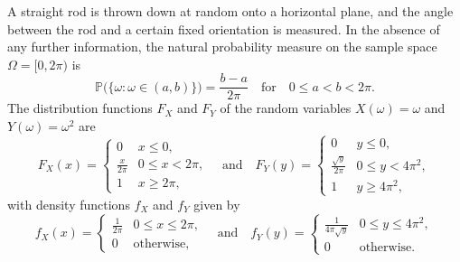 \documentclass[lecture]{csm}
\newcommand{\prob}{\mathbb{P}}
\newcommand{\R}{\mathbb{R}}
\def\it{\item}
\def\bit{\begin{itemize}}
\def\eit{\end{itemize}}
\begin{document}
%
%

\newpage

\begin{example}
A straight rod is thrown down at random onto a horizontal plane, and the angle between the rod and a certain fixed orientation is measured. In the absence of any further information, the natural probability measure on the sample space $\Omega = [0,2\pi)$ is
\[
\prob\big(\big\{\omega:\omega\in(a,b)\big\}\big)=\frac{b-a}{2\pi} \quad\text{for}\quad 0\leq a < b < 2\pi.
\]
The distribution functions $F_X$ and $F_Y$ of the random variables $X(\omega)=\omega$ and $Y(\omega)=\omega^2$ are
\[
F_X(x) = \begin{cases}
	0				& x \leq 0, \\[2ex]
	\displaystyle\frac{x}{2\pi}	& 0 \leq x < 2\pi, \\[2ex]
	1				& x \geq 2\pi,
\end{cases}
\quad\text{and}\quad
F_Y(y) = \begin{cases}
	0						& y \leq 0, \\[2ex]
	\displaystyle\frac{\sqrt{y}}{2\pi}	& 0 \leq y < 4\pi^2, \\[2ex]
	1						& y \geq 4\pi^2,
\end{cases}
\]
with density functions $f_X$ and $f_Y$ given by
\[
f_X(x)=\begin{cases}
\displaystyle\frac{1}{2\pi}	& 0\leq x\leq 2\pi, \\[2ex]
0							& \text{otherwise},
\end{cases}
\quad\text{and}\quad
f_Y(y)=\begin{cases}
\displaystyle\frac{1}{4\pi\sqrt{y}}	& 0\leq y\leq 4\pi^2, \\[2ex]
0									& \text{otherwise}.
\end{cases}
\]
\end{example}
\end{document}

